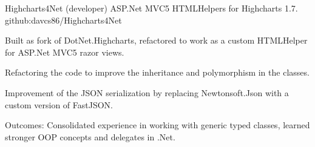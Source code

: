 \begin{cventries}

\cventry
{Highcharts4Net (developer)} %
{ASP.Net MVC5 HTMLHelpers for Highcharts 1.7.} %
{ } %
{github:davcs86/Highcharts4Net} %
{ %
	\begin{cvitems}
		\item {Built as fork of DotNet.Highcharts, refactored to work as a custom HTMLHelper for ASP.Net MVC5 razor views.}
		\item {Refactoring the code to improve the inheritance and polymorphism in the classes.}
		\item {Improvement of the JSON serialization by replacing Newtonsoft.Json with a custom version of FastJSON.}
		\item {Outcomes: Consolidated experience in working with generic typed classes, learned stronger OOP concepts and delegates in .Net.}
	\end{cvitems}
}



\end{cventries}